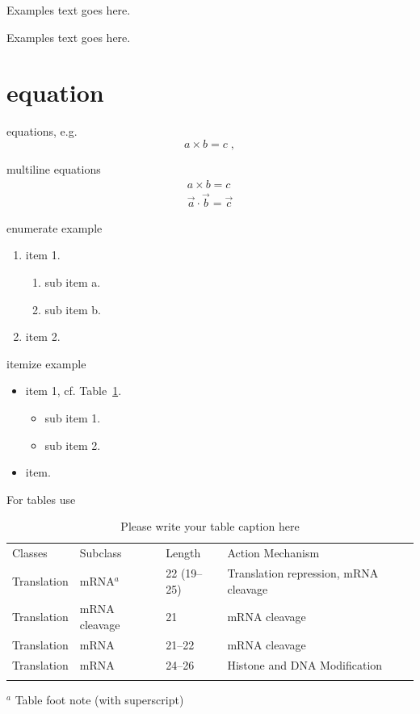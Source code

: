 \begin{exercise}
	Examples text goes here.  
\end{exercise}

\begin{solution}
	Examples text goes here.  
\end{solution}


\section{equation}
equations, e.g.
\begin{equation}
a \times b = c\;,
\end{equation}

multiline equations
\begin{eqnarray}
a \times b = c \nonumber\\
\vec{a} \cdot \vec{b}=\vec{c}
\label{eq:01}
\end{eqnarray}

enumerate example
\begin{enumerate}
	\item{item 1.}
	\begin{enumerate}
		\item{sub item a.}
		\item{sub item b.}
	\end{enumerate}
	\item{item 2.}
\end{enumerate}

itemize example
\begin{itemize}
	\item{item 1, cf. Table~\ref{tab:1}.}
	\begin{itemize}
		\item{sub item 1.}
		\item{sub item 2.}
	\end{itemize}
	\item{item.}
\end{itemize}

For tables use
\begin{table}
	\caption{Please write your table caption here}
	\label{tab:1}       %
	\begin{tabular}{p{2cm}p{2.4cm}p{2cm}p{4.9cm}}
		\hline\noalign{\smallskip}
		Classes & Subclass & Length & Action Mechanism  \\
		\noalign{\smallskip}\svhline\noalign{\smallskip}
		Translation & mRNA$^a$  & 22 (19--25) & Translation repression, mRNA cleavage\\
		Translation & mRNA cleavage & 21 & mRNA cleavage\\
		Translation & mRNA  & 21--22 & mRNA cleavage\\
		Translation & mRNA  & 24--26 & Histone and DNA Modification\\
		\noalign{\smallskip}\hline\noalign{\smallskip}
	\end{tabular}
	$^a$ Table foot note (with superscript)
\end{table}

